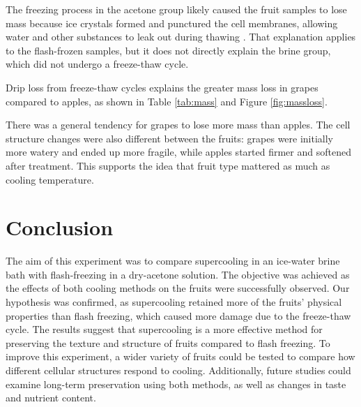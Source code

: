The freezing process in the acetone group likely caused the fruit
samples to lose mass because ice crystals formed and punctured the cell
membranes, allowing water and other substances to leak out during
thawing \cite{lorv2014}. That explanation applies to the flash-frozen
samples, but it does not directly explain the brine group, which did
not undergo a freeze-thaw cycle.

Drip loss from freeze-thaw cycles explains the greater mass loss in grapes compared to apples, as shown in Table \ref{tab:mass} and Figure \ref{fig:massloss}.


There was a general tendency for grapes to lose more mass than apples.
The cell structure changes were also different between the fruits: grapes were
initially more watery and ended up more fragile, while apples started
firmer and softened after treatment. This supports the idea that fruit
type mattered as much as cooling temperature.

\section{Conclusion}


The aim of this experiment was to compare supercooling in an ice-water
brine bath with flash-freezing in a dry-acetone solution. The objective
was achieved as the effects of both cooling methods on the fruits were
successfully observed. Our hypothesis was confirmed, as supercooling 
retained more of the fruits' physical properties than flash freezing, which
caused more damage due to the freeze-thaw cycle. The results suggest that
supercooling is a more effective method for preserving the texture and
structure of fruits compared to flash freezing. To
improve this experiment, a wider variety of fruits could be tested to
compare how different cellular structures respond to cooling.
Additionally, future studies could examine long-term preservation using
both methods, as well as changes in taste and nutrient content.
